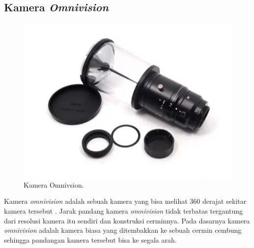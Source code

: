 \subsection{Kamera \emph{Omnivision}}
\label{sec:omnivision}
\begin{figure}[H]
    \centering
  
    \includegraphics[scale=0.20]{gambar/omnivisino2.jpeg}
  
    \caption{Kamera Omnivsion.}
    \label{fig:omnivision}
\end{figure}
Kamera \emph{omnivision} adalah sebuah kamera yang bisa melihat 360 derajat sekitar 
kamera tersebut \parencite{ref_kamera_omni}. 
Jarak pandang kamera \emph{omnivision} tidak terbatas 
tergantung dari resolusi kamera itu sendiri dan 
konstruksi cerminnya. Pada dasarnya kamera \emph{omnivision} 
adalah kamera biasa yang ditembakkan ke sebuah cermin cembung 
sehingga pandangan kamera tersebut bisa ke segala arah. 

